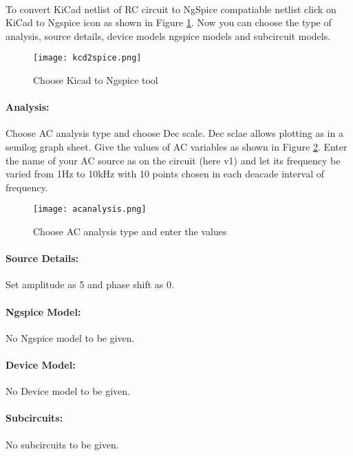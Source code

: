 \paragraph{} To convert KiCad netlist of RC circuit to NgSpice
compatiable netlist click on KiCad to Ngspice icon as shown in Figure \ref{kcd2spiceRC}.  Now you can choose the type of analysis, source details, device models ngspice models and subcircuit models.


\begin{figure}[h]
\centering
\texttt{[image: kcd2spice.png]}
\caption{Choose Kicad to Ngspice tool}
\label{kcd2spiceRC}
\end{figure}


\paragraph{Analysis:}Choose AC analysis type and choose Dec scale. Dec sclae allows plotting as in a semilog graph sheet.  Give the values of AC variables as shown in Figure \ref{acanalysis}. Enter the name of your AC source as on the circuit (here v1) and let its frequency be varied from 1Hz to 10kHz with 10 points chosen in each deacade interval of frequency.

\begin{figure}[h]
\centering
\texttt{[image: acanalysis.png]}
\caption{Choose AC analysis type and enter the values}
\label{acanalysis}
\end{figure}

\paragraph{Source Details:} Set amplitude as 5 and phase shift as 0.

\paragraph{Ngspice Model:} No Ngspice model to be given.

\paragraph{Device Model:} No Device model to be given.

\paragraph{Subcircuits:} No subcircuits to be given.

